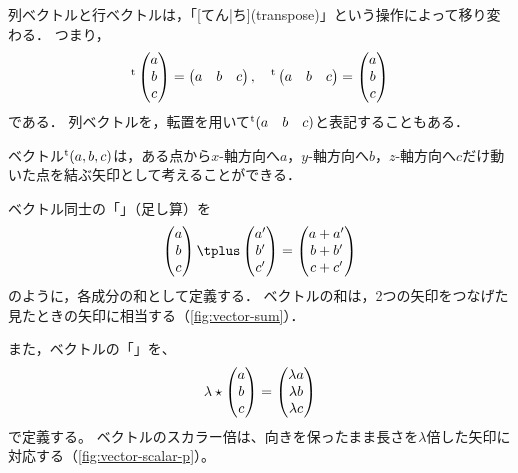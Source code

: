 \documentclass[../sotsu.tex]{subfiles}
\begin{document}
列ベクトルと行ベクトルは，「[てん|ち](transpose)」という操作によって移り変わる．
つまり，
\begin{equation*}
    {}^{\mathrm{t}}\begin{pmatrix}
        a  \\  b  \\  c
    \end{pmatrix}
    =
    \begin{pmatrix}
        a  &  b  &  c
    \end{pmatrix},
    \quad
    {}^{\mathrm{t}}\begin{pmatrix}
        a  &  b  &  c
    \end{pmatrix}
    =
    \begin{pmatrix}
        a  \\  b  \\  c
    \end{pmatrix}
\end{equation*}
である．
列ベクトルを，転置を用いて${}^{\mathrm{t}}(a \quad b \quad c)$と表記することもある．

ベクトル${}^{\mathrm{t}}(a, b, c)$は，ある点から$x$-軸方向へ$a$，$y$-軸方向へ$b$，$z$-軸方向へ$c$だけ動いた点を結ぶ矢印として考えることができる．

ベクトル同士の「」（足し算）を
\begin{equation*}
    \begin{pmatrix}
        a  \\  b  \\  c
    \end{pmatrix}
    \vecplus
    \begin{pmatrix}
        a' \\ b' \\ c'
    \end{pmatrix}
    =
    \begin{pmatrix}
        a + a'  \\  b + b'  \\  c + c'
    \end{pmatrix}
\end{equation*}
のように，各成分の和として定義する．
ベクトルの和は，2つの矢印をつなげた見たときの矢印に相当する（\cref{fig:vector-sum}）．

また，ベクトルの「」を、
\begin{equation*}
    \lambda \mathbin{\star} 
    \begin{pmatrix}
        a  \\  b  \\  c
    \end{pmatrix}
    =
    \begin{pmatrix}
        \lambda a  \\  \lambda b  \\  \lambda c
    \end{pmatrix}
\end{equation*}
で定義する。
ベクトルのスカラー倍は、向きを保ったまま長さを$\lambda$倍した矢印に対応する（\cref{fig:vector-scalar-p}）。
\end{document}
